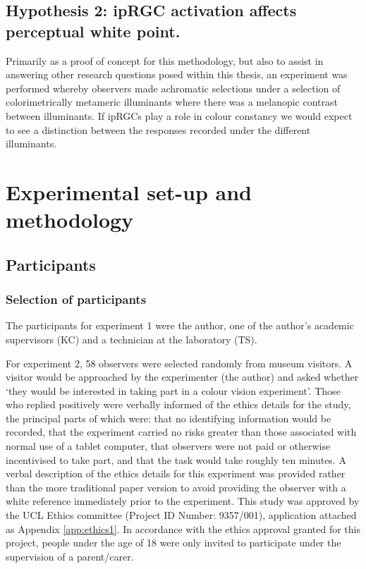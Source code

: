 \subsection*{Hypothesis 2: \gls{ipRGC} activation affects perceptual white point.}
Primarily as a proof of concept for this methodology, but also to assist in answering other research questions posed within this thesis, an experiment was performed whereby observers made achromatic selections under a selection of colorimetrically metameric illuminants where there was a melanopic contrast between illuminants.
If \gls{ipRGCs} play a role in colour constancy we would expect to see a distinction between the responses recorded under the different illuminants. 

\section{Experimental set-up and methodology}
\subsection{Participants}

\subsubsection{Selection of participants}

The participants for experiment 1 were the author, one of the author's academic supervisors (KC) and a technician at the laboratory (TS).

For experiment 2, 58 observers were selected randomly from museum visitors. A visitor would be approached by the experimenter (the author) and asked whether `they would be interested in taking part in a colour vision experiment'. Those who replied positively were verbally informed of the ethics details for the study, the principal parts of which were: that no identifying information would be recorded, that the experiment carried no risks greater than those associated with normal use of a tablet computer, that observers were not paid or otherwise incentivised to take part, and that the task would take roughly ten minutes. A verbal description of the ethics details for this experiment was provided rather than the more traditional paper version to avoid providing the observer with a white reference immediately prior to the experiment. This study was approved by the \gls{UCL} Ethics committee (Project ID Number: 9357/001), application attached as Appendix \ref{app:ethics1}. In accordance with the ethics approval granted for this project, people under the age of 18 were only invited to participate under the supervision of a parent/carer.

